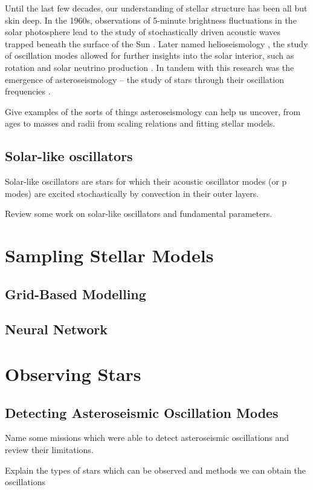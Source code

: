 Until the last few decades, our understanding of stellar structure has been all but skin deep. In the 1960s, observations of 5-minute brightness fluctuations in the solar photosphere lead to the study of stochastically driven acoustic waves trapped beneath the surface of the Sun \citep{Ulrich1970, Ando.Osaki1975}. Later named helioseismology \citep{Deubner.Gough1984}, the study of oscillation modes allowed for further insights into the solar interior, such as rotation \citep{Deubner.Ulrich.ea1979} and solar neutrino production \citep{Bahcall.Ulrich1988}. In tandem with this research was the emergence of asteroseismology -- the study of stars through their oscillation frequencies \citep{Christensen-Dalsgaard1984}.

Give examples of the sorts of things asteroseismology can help us uncover, from ages \citep[see, e.g.]{Ulrich1986, Soderblom2010, SilvaAguirre.Davies.ea2015} to masses and radii from scaling relations \citep{} and fitting stellar models\citep{}.

\subsection{Solar-like oscillators}

Solar-like oscillators are stars for which their acoustic oscillator modes (or p modes) are excited stochastically by convection in their outer layers.

Review some work on solar-like oscillators and fundamental parameters.

\section{Sampling Stellar Models}

\subsection{Grid-Based Modelling}

\subsection{Neural Network}

\section{Observing Stars}

\subsection{Detecting Asteroseismic Oscillation Modes}

Name some missions which were able to detect asteroseismic oscillations and review their limitations.

Explain the types of stars which can be observed and methods we can obtain the oscillations
